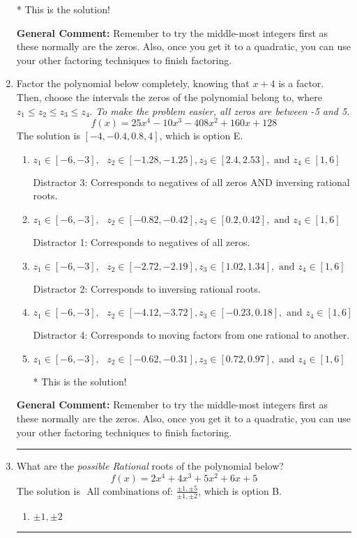 \documentclass{extbook}[14pt]
\newcommand{\litem}[1]{\item #1

\rule{\textwidth}{0.4pt}}
\begin{document}
\begin{enumerate}
{\begin{enumerate}[label=\Alph*.]
* This is the solution!
\end{enumerate}

\textbf{General Comment:} Remember to try the middle-most integers first as these normally are the zeros. Also, once you get it to a quadratic, you can use your other factoring techniques to finish factoring.
}
\litem{
Factor the polynomial below completely, knowing that $x+4$ is a factor. Then, choose the intervals the zeros of the polynomial belong to, where $z_1 \leq z_2 \leq z_3 \leq z_4$. \textit{To make the problem easier, all zeros are between -5 and 5.}
\[ f(x) = 25x^{4} -10 x^{3} -408 x^{2} +160 x + 128 \]The solution is \( [-4, -0.4, 0.8, 4] \), which is option E.\begin{enumerate}[label=\Alph*.]
\item \( z_1 \in [-6, -3], \text{   }  z_2 \in [-1.28, -1.25], z_3 \in [2.4, 2.53], \text{   and   } z_4 \in [1, 6] \)

 Distractor 3: Corresponds to negatives of all zeros AND inversing rational roots.
\item \( z_1 \in [-6, -3], \text{   }  z_2 \in [-0.82, -0.42], z_3 \in [0.2, 0.42], \text{   and   } z_4 \in [1, 6] \)

 Distractor 1: Corresponds to negatives of all zeros.
\item \( z_1 \in [-6, -3], \text{   }  z_2 \in [-2.72, -2.19], z_3 \in [1.02, 1.34], \text{   and   } z_4 \in [1, 6] \)

 Distractor 2: Corresponds to inversing rational roots.
\item \( z_1 \in [-6, -3], \text{   }  z_2 \in [-4.12, -3.72], z_3 \in [-0.23, 0.18], \text{   and   } z_4 \in [1, 6] \)

 Distractor 4: Corresponds to moving factors from one rational to another.
\item \( z_1 \in [-6, -3], \text{   }  z_2 \in [-0.62, -0.31], z_3 \in [0.72, 0.97], \text{   and   } z_4 \in [1, 6] \)

* This is the solution!
\end{enumerate}

\textbf{General Comment:} Remember to try the middle-most integers first as these normally are the zeros. Also, once you get it to a quadratic, you can use your other factoring techniques to finish factoring.
}
\litem{
What are the \textit{possible Rational} roots of the polynomial below?
\[ f(x) = 2x^{4} +4 x^{3} +5 x^{2} +6 x + 5 \]The solution is \( \text{ All combinations of: }\frac{\pm 1,\pm 5}{\pm 1,\pm 2} \), which is option B.\begin{enumerate}[label=\Alph*.]
\item \( \pm 1,\pm 2 \)


\end{enumerate}}
\end{enumerate}
\end{document}
